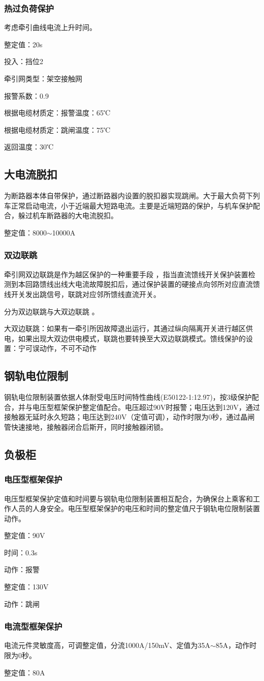 \subsubsection{热过负荷保护}
考虑牵引曲线电流上升时间。\par  
整定值：20s\par 
投入：挡位2\par 
牵引网类型：架空接触网\par 
报警系数：0.9\par 
根据电缆材质定：报警温度：65℃\par 
根据电缆材质定：跳闸温度：75℃\par 
返回温度：30℃
\subsection{大电流脱扣}
为断路器本体自带保护，通过断路器内设置的脱扣器实现跳闸。大于最大负荷下列车正常启动电流，小于近端最大短路电流。主要是近端短路的保护，与机车保护配合，躲过机车断路器的大电流脱扣。\par
整定值：8000$\sim$10000A
\subsubsection{双边联跳}
牵引网双边联跳是作为越区保护的一种重要手段 ，指当直流馈线开关保护装置检测到本回路馈线出线大电流故障脱扣后，通过保护装置的硬接点向邻所对应直流馈线开关发出跳信号，联跳对应邻所馈线直流开关。\par  
分为双边联跳与大双边联跳 。\par 
大双边联跳：如果有一牵引所因故障退出运行，其通过纵向隔离开关进行越区供电，如果出现大双边供电模式，联跳也要转换至大双边联跳模式。馈线保护的设置：宁可误动作，不可不动作

\subsection{钢轨电位限制}
钢轨电位限制装置依据人体耐受电压时间特性曲线(E50122-1:12.97)，按3级保护配合，并与电压型框架保护整定值配合。电压超过90V时报警；电压达到120V，通过接触器无延时永久短路；电压达到240V（定值可调），动作时限为0秒，通过晶闸管快速接地，接触器闭合后斯开，同时接触器闭锁。
\subsection{负极柜}
\subsubsection{电压型框架保护}
电压型框架保护定值和时间要与钢轨电位限制装置相互配合，为确保台上乘客和工作人员的人身安全。电压型框架保护的电压和时间的整定值尺于钢轨电位限制装置动作。\par 
整定值：90V\par
时间：0.3s\par
动作：报警\par
整定值：130V\par
动作：跳闸
\subsubsection{电流型框架保护}
电流元件灵敏度高，可调整定值，分流1000A/150mV、定值为35A$\sim$85A，动作时限为0秒。\par   
整定值：80A
\addtocounter{page}{-1}
